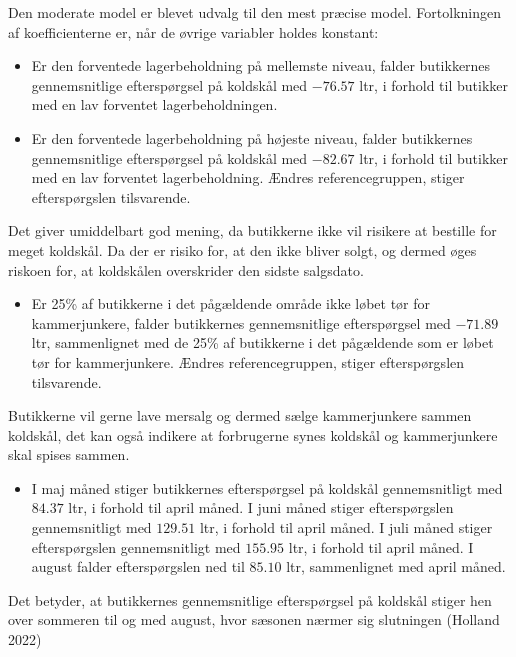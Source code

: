 \documentclass[
  12pt,
  a4paper,
  DIV=11,
  numbers=noendperiod,
  oneside,
  open=any]{scrartcl}
\providecommand{\tightlist}{%
  \setlength{\itemsep}{0pt}\setlength{\parskip}{0pt}}\usepackage{longtable,booktabs,array}
\begin{document}
Den moderate model er blevet udvalg til den mest præcise model.
Fortolkningen af koefficienterne er, når de øvrige variabler holdes
konstant:

\begin{itemize}
\item
  Er den forventede lagerbeholdning på mellemste niveau, falder
  butikkernes gennemsnitlige efterspørgsel på koldskål med \(-76.57\)
  ltr, i forhold til butikker med en lav forventet lagerbeholdningen.
\item
  Er den forventede lagerbeholdning på højeste niveau, falder
  butikkernes gennemsnitlige efterspørgsel på koldskål med \(-82.67\)
  ltr, i forhold til butikker med en lav forventet lagerbeholdning.
  Ændres referencegruppen, stiger efterspørgslen tilsvarende.
\end{itemize}

Det giver umiddelbart god mening, da butikkerne ikke vil risikere at
bestille for meget koldskål. Da der er risiko for, at den ikke bliver
solgt, og dermed øges riskoen for, at koldskålen overskrider den sidste
salgsdato.

\begin{itemize}
\tightlist
\item
  Er 25\% af butikkerne i det pågældende område ikke løbet tør for
  kammerjunkere, falder butikkernes gennemsnitlige efterspørgsel med
  \(-71.89\) ltr, sammenlignet med de 25\% af butikkerne i det
  pågældende som er løbet tør for kammerjunkere. Ændres
  referencegruppen, stiger efterspørgslen tilsvarende.
\end{itemize}

Butikkerne vil gerne lave mersalg og dermed sælge kammerjunkere sammen
koldskål, det kan også indikere at forbrugerne synes koldskål og
kammerjunkere skal spises sammen.

\begin{itemize}
\tightlist
\item
  I maj måned stiger butikkernes efterspørgsel på koldskål
  gennemsnitligt med \(84.37\) ltr, i forhold til april måned. I juni
  måned stiger efterspørgslen gennemsnitligt med \(129.51\) ltr, i
  forhold til april måned. I juli måned stiger efterspørgslen
  gennemsnitligt med \(155.95\) ltr, i forhold til april måned. I august
  falder efterspørgslen ned til \(85.10\) ltr, sammenlignet med april
  måned.
\end{itemize}

Det betyder, at butikkernes gennemsnitlige efterspørgsel på koldskål
stiger hen over sommeren til og med august, hvor sæsonen nærmer sig
slutningen (Holland 2022)
\end{document}
